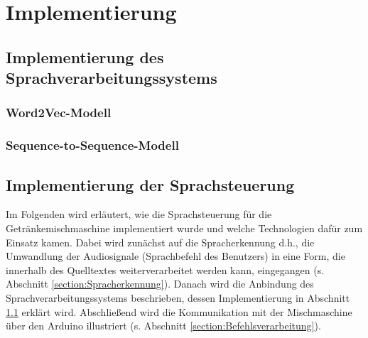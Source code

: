 \chapter{Implementierung}
\section{Implementierung des Sprachverarbeitungssystems}\label{section:Implementierung_Sprachverarbeitung}
\subsection{Word2Vec-Modell}
\subsection{Sequence-to-Sequence-Modell}
\section{Implementierung der Sprachsteuerung}
Im Folgenden wird erläutert, wie die Sprachsteuerung für die Getränkemischmaschine implementiert wurde und welche Technologien dafür zum Einsatz kamen. Dabei wird zunächst auf die Spracherkennung d.h., die Umwandlung der Audiosignale (Sprachbefehl des Benutzers) in eine Form, die innerhalb des Quelltextes weiterverarbeitet werden kann, eingegangen (s. Abschnitt \ref{section:Spracherkennung}). Danach wird die Anbindung des Sprachverarbeitungssystems beschrieben, dessen Implementierung in Abschnitt \ref{section:Implementierung_Sprachverarbeitung} erklärt wird. Abschließend wird die Kommunikation mit der Mischmaschine über den Arduino illustriert (s. Abschnitt \ref{section:Befehlsverarbeitung}).
